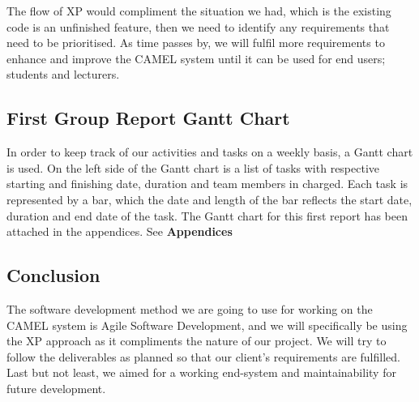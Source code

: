 		The flow of XP would compliment the situation we had, which is the existing code is an unfinished feature, then we need to identify any requirements that need to be prioritised. As time passes by, we will fulfil more requirements to enhance and improve the CAMEL system until it can be used for end users; students and lecturers.
\newpage	
	\subsection*{First Group Report Gantt Chart}
		In order to keep track of our activities and tasks on a weekly basis, a Gantt chart is used. On the left side of the Gantt chart is a list of tasks with respective starting and finishing date, duration and team members in charged. Each task is represented by a bar, which the date and length of the bar reflects the start date, duration and end date of the task. The Gantt chart for this first report has been attached in the appendices. See \textbf{Appendices} 
	
	\subsection*{Conclusion}
		The software development method we are going to use for working on the CAMEL system is Agile Software Development, and we will specifically be using the XP approach as it compliments the nature of our project. We will try to follow the deliverables as planned so that our client’s requirements are fulfilled. Last but not least, we aimed for a working end-system and maintainability for future development.

	

